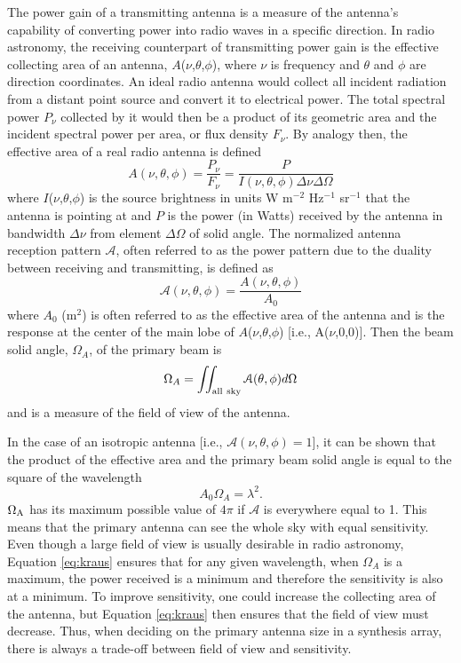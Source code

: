 The power gain of a transmitting antenna is a measure of the antenna's capability of converting power into radio waves in a specific direction. In radio astronomy, the receiving counterpart of transmitting power gain is the effective collecting area of an antenna, $A$($\nu$,$\theta$,$\phi$), where $\nu$ is frequency and $\theta$ and $\phi$ are direction coordinates. An ideal radio antenna would collect all incident radiation from a distant point source and convert it to electrical power. The total spectral power $P_{\nu}$ collected by it would then be a product of its geometric area and the incident spectral power per area, or flux density $F_{\nu}$. By analogy then, the effective area of a real radio antenna is defined
\begin{equation}
A(\nu,\theta,\phi)= \frac{P_{\nu}}{F_{\nu}}=\frac{P}{I(\nu,\theta,\phi)\Delta \nu \Delta \Omega}
\end{equation}
where $I$($\nu$,$\theta$,$\phi$) is the source brightness in units W m$^{-2}$ Hz$^{-1}$ sr$^{-1}$ that the antenna is pointing at and $P$ is the power (in Watts) received by the antenna in bandwidth $\Delta \nu$ from element $\Delta\Omega$ of solid angle. The normalized antenna reception pattern $\mathcal{A}$, often referred to as the power pattern due to the duality between receiving and transmitting, is defined as 
\begin{equation}
\mathcal{A}(\nu,\theta,\phi)= \frac{A(\nu,\theta,\phi)}{A_{0}}
\end{equation}
where $A_0$ (m$^2$) is often referred to as the effective area of the antenna and is the response at the center of the main lobe of $A$($\nu$,$\theta$,$\phi$) [i.e., A($\nu$,0,0)]. Then the beam solid angle, $\Omega _{A}$, of the primary beam is 
\begin{equation}
\Omega _{A} = \int \!\!\! \int _{\rm{all\ sky}} \mathcal{A}(\theta,\phi) d \Omega
\end{equation}
and is a measure of the field of view of the antenna. 

In the case of an isotropic antenna [i.e., $\mathcal{A}(\nu,\theta,\phi)=1$], it can be shown that the product of the effective area and the primary beam solid angle is equal to the square of the wavelength \citep{kraus_1986}
\begin{equation}\label{eq:kraus}
A_{0}\Omega _{A} = \lambda ^2.
\end{equation}
$\Omega _{\rm{A}}$ has its maximum possible value of $4\pi$ if $\mathcal{A}$ is everywhere equal to 1. This means that the primary antenna can see the whole sky with equal sensitivity. Even though a large field of view is usually desirable in radio astronomy, Equation \ref{eq:kraus} ensures that for any given wavelength, when $\Omega _{A}$ is a maximum, the power received is a minimum and therefore the sensitivity is also at a minimum. To improve sensitivity, one could increase the collecting area of the antenna, but Equation \ref{eq:kraus} then ensures that the field of view must decrease. Thus, when deciding on the primary antenna size in a synthesis array, there is always a trade-off between field of view and sensitivity. 

